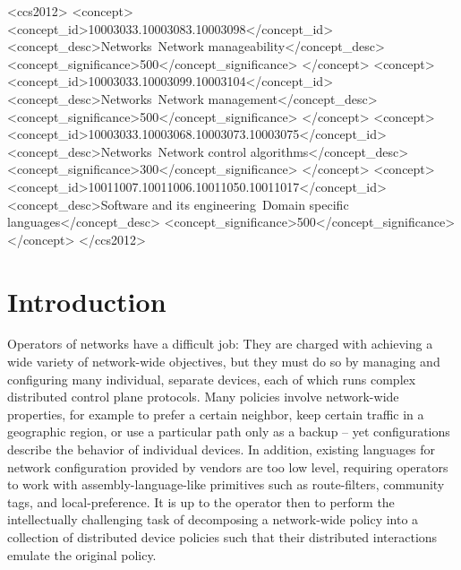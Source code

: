 \documentclass[10pt]{sig-alternate}
\begin{document}

\begin{CCSXML}
<ccs2012>
<concept>
<concept_id>10003033.10003083.10003098</concept_id>
<concept_desc>Networks~Network manageability</concept_desc>
<concept_significance>500</concept_significance>
</concept>
<concept>
<concept_id>10003033.10003099.10003104</concept_id>
<concept_desc>Networks~Network management</concept_desc>
<concept_significance>500</concept_significance>
</concept>
<concept>
<concept_id>10003033.10003068.10003073.10003075</concept_id>
<concept_desc>Networks~Network control algorithms</concept_desc>
<concept_significance>300</concept_significance>
</concept>
<concept>
<concept_id>10011007.10011006.10011050.10011017</concept_id>
<concept_desc>Software and its engineering~Domain specific languages</concept_desc>
<concept_significance>500</concept_significance>
</concept>
</ccs2012>
\end{CCSXML}



%
%
%
%

\section{Introduction}
 
Operators of networks have a difficult job: They are charged
with achieving a wide variety of network-wide objectives, but they must do so by
managing and configuring many individual, separate devices, each of which runs
complex distributed control plane protocols. 
Many policies involve network-wide properties, for example to prefer a certain neighbor, keep certain traffic in a geographic region, or use a particular path only as a backup -- yet configurations describe the behavior of individual devices.
%
In addition, existing languages
for network configuration provided by vendors are too low level, requiring operators to work with assembly-language-like primitives such as route-filters, community tags, and local-preference. 
%
It is up to the operator then to perform the intellectually challenging task of decomposing a network-wide policy into a collection of distributed device policies such that their distributed interactions emulate the original policy.
\end{document}
